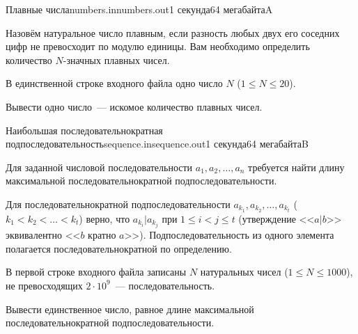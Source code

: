 \documentclass[12pt,a4paper,oneside,twocolumn,landscape]{article}
\begin{document}
\raggedbottom

\begin{problem}{Плавные числа}{numbers.in}{numbers.out}{1 секунда}{64 мегабайта}{A}
\graphicspath{{../numbers/statements/}}


Назовём натуральное число плавным, если разность любых двух его соседних цифр 
не превосходит по модулю единицы. Вам необходимо определить количество $N$-значных 
плавных чисел.

\InputFile
В единственной строке входного файла одно число $N$ ($1 \leqslant N \leqslant 20$).

\OutputFile
Вывести одно число~--- искомое количество плавных чисел.


\Example

\begin{example}
%
\end{example}


\end{problem}

\bigskip\bigskip
\begin{problem}{Наибольшая последовательнократная подпоследовательность}{sequence.in}{sequence.out}{1 секунда}{64 мегабайта}{B}
\graphicspath{{../sequence/statements/}}


Для заданной числовой последовательности $a_1, a_2, \dots , a_n$ требуется найти длину максимальной последовательнократной подпоследовательности.

Для последовательнократной подпоследовательности $a_{k_1}, a_{k_2}, \dots, a_{k_t}$ ($k_1 < k_2 < \dots < k_t$) верно, что $a_{k_i} | a_{k_j}$ при $1 \leqslant i < j \leqslant t$ (утверждение <<$a|b$>> эквивалентно <<$b$ кратно $a$>>). Подпоследовательность из одного элемента полагается последовательнократной по определению.

\InputFile
В первой строке входного файла записаны $N$ натуральных чисел ($1 \leqslant N \leqslant 1000$), не превосходящих $2\cdot10^9$~--- последовательность.

\OutputFile
Вывести единственное число, равное длине максимальной последовательнократной подпоследовательности.


\Example

\begin{example}
%
\end{example}


\end{problem}
\end{document}
